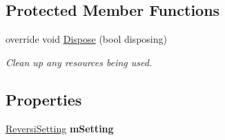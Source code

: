 \subsection*{Protected Member Functions}
\begin{DoxyCompactItemize}
\item 
override void \hyperlink{class_reversi4color_form_1_1_setting_form_aea34274bc1a5cf018805d0bd6b429a77}{Dispose} (bool disposing)
\begin{DoxyCompactList}\small\item\em Clean up any resources being used. \end{DoxyCompactList}\end{DoxyCompactItemize}
\subsection*{Properties}
\begin{DoxyCompactItemize}
\item 
\mbox{\label{class_reversi4color_form_1_1_setting_form_ad8006212a47be44ecdb66bd7bef62e12}} 
\hyperlink{class_reversi4color_form_1_1_reversi_setting}{Reversi\+Setting} {\bfseries m\+Setting}
\end{DoxyCompactItemize}
